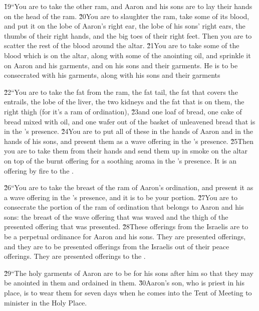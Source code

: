 \v{19}``You are to take the other ram, and Aaron and his sons are to lay their hands on the head of the ram. \v{20}You are to slaughter the ram, take some of its blood, and put it on the lobe of Aaron's right ear, the lobe of his sons' right ears, the thumbs of their right hands, and the big toes of their right feet. Then you are to scatter the rest of the blood around the altar. \v{21}You are to take some of the blood which is on the altar, along with some of the anointing oil, and sprinkle it on Aaron and his garments, and on his sons and their garments. He is to be consecrated with his garments, along with his sons and their garments

\v{22}``You are to take the fat from the ram, the fat tail, the fat that covers the entrails, the lobe of the liver, the two kidneys and the fat that is on them, the right thigh (for it's a ram of ordination), \v{23}and one loaf of bread, one cake of bread mixed with oil, and one wafer out of the basket of unleavened bread that is in the 's presence. \v{24}You are to put all of these in the hands of Aaron and in the hands of his sons, and present them as a wave offering in the 's presence. \v{25}Then you are to take them from their hands and send them up in smoke on the altar on top of the burnt offering for a soothing aroma in the 's presence. It is an offering by fire to the .

\v{26}``You are to take the breast of the ram of Aaron's ordination, and present it as a wave offering in the 's presence, and it is to be your portion. \v{27}You are to consecrate the portion of the ram of ordination that belongs to Aaron and his sons: the breast of the wave offering that was waved and the thigh of the presented offering that was presented. \v{28}These offerings from the Israelis are to be a perpetual ordinance for Aaron and his sons. They are presented offerings, and they are to be presented offerings from the Israelis out of their peace offerings. They are presented offerings to the .

\v{29}``The holy garments of Aaron are to be for his sons after him so that they may be anointed in them and ordained in them. \v{30}Aaron's son, who is priest in his place, is to wear them for seven days when he comes into the Tent of Meeting to minister in the Holy Place.

